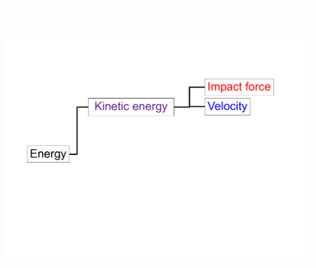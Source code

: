 \begin{frame}[noframenumbering]
\frametitle{{\textcolor{white}{Energy as a safety indicator}}}

\begin{columns}
\column{.95\paperwidth}

\begin{center}                
\includegraphics[width=1\textwidth ]{figures/fin04.pdf}
\end{center}       

\end{columns}

\end{frame}




